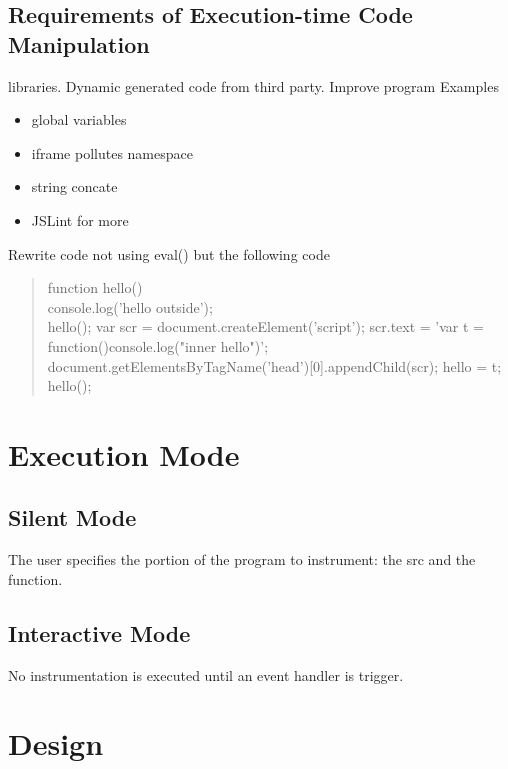 \documentclass[a4paper,twocolumn,10pt]{article}
\def\denseitems{
  \itemsep1pt plus1pt minus1pt
  \parsep0pt plus0pt
  \parskip0pt\topsep0pt}
\begin{document}
\subsection{Requirements of Execution-time Code Manipulation}
libraries. Dynamic generated code from third party. Improve program Examples
\begin{itemize}\denseitems
    \item global variables
    \item iframe pollutes namespace
    \item string concate
    \item JSLint for more
\end{itemize}

Rewrite code not using eval() but the following code
\begin{quote}
    function hello(){\\
		console.log('hello outside');\\
	}	
	hello();
	var scr = document.createElement('script');
	scr.text = 'var t = function(){console.log("inner hello")}';
	document.getElementsByTagName('head')[0].appendChild(scr);
	hello = t;
	hello();
\end{quote}



\section{Execution Mode}
\subsection{Silent Mode}
The user specifies the portion of the program to instrument: the src and the function.

\subsection{Interactive Mode}
No instrumentation is executed until an event handler is trigger.

\section{Design}
\end{document}
